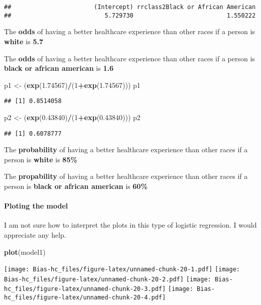\documentclass[]{article}
\newenvironment{Shaded}{\begin{snugshade}}{\end{snugshade}}
\newcommand{\DecValTok}[1]{\textcolor[rgb]{0.00,0.00,0.81}{#1}}
\newcommand{\FloatTok}[1]{\textcolor[rgb]{0.00,0.00,0.81}{#1}}
\newcommand{\KeywordTok}[1]{\textcolor[rgb]{0.13,0.29,0.53}{\textbf{#1}}}
\newcommand{\NormalTok}[1]{#1}
\newcommand{\OperatorTok}[1]{\textcolor[rgb]{0.81,0.36,0.00}{\textbf{#1}}}
\newcommand{\StringTok}[1]{\textcolor[rgb]{0.31,0.60,0.02}{#1}}
\let\oldparagraph\paragraph
\renewcommand{\paragraph}[1]{\oldparagraph{#1}\mbox{}}
\begin{document}
\begin{verbatim}
##                       (Intercept) rrclass2Black or African American 
##                          5.729730                          1.550222
\end{verbatim}

The \textbf{odds} of having a better healthcare experience than other
races if a person is \textbf{white} is \textbf{5.7}

The \textbf{odds} of having a better healthcare experience than other
races if a person is \textbf{black or african american} is \textbf{1.6}

\begin{Shaded}
\begin{Highlighting}[]
\NormalTok{p1 <-}\StringTok{ }\NormalTok{(}\KeywordTok{exp}\NormalTok{(}\FloatTok{1.74567}\NormalTok{)}\OperatorTok{/}\NormalTok{(}\DecValTok{1}\OperatorTok{+}\KeywordTok{exp}\NormalTok{(}\FloatTok{1.74567}\NormalTok{)))}
\NormalTok{p1}
\end{Highlighting}
\end{Shaded}

\begin{verbatim}
## [1] 0.8514058
\end{verbatim}

\begin{Shaded}
\begin{Highlighting}[]
\NormalTok{p2 <-}\StringTok{ }\NormalTok{(}\KeywordTok{exp}\NormalTok{(}\FloatTok{0.43840}\NormalTok{)}\OperatorTok{/}\NormalTok{(}\DecValTok{1}\OperatorTok{+}\KeywordTok{exp}\NormalTok{(}\FloatTok{0.43840}\NormalTok{)))}
\NormalTok{p2}
\end{Highlighting}
\end{Shaded}

\begin{verbatim}
## [1] 0.6078777
\end{verbatim}

The \textbf{probability} of having a better healthcare experience than
other races if a person is \textbf{white} is \textbf{85\%}

The \textbf{propability} of having a better healthcare experience than
other races if a person is \textbf{black or african american} is
\textbf{60\%}

\hypertarget{ploting-the-model}{%
\paragraph{Ploting the model}\label{ploting-the-model}}

I am not sure how to interpret the plots in this type of logistic
regression. I would appreciate any help.

\begin{Shaded}
\begin{Highlighting}[]
\KeywordTok{plot}\NormalTok{(model1)}
\end{Highlighting}
\end{Shaded}

\texttt{[image: Bias-hc\_files/figure-latex/unnamed-chunk-20-1.pdf]}
\texttt{[image: Bias-hc\_files/figure-latex/unnamed-chunk-20-2.pdf]}
\texttt{[image: Bias-hc\_files/figure-latex/unnamed-chunk-20-3.pdf]}
\texttt{[image: Bias-hc\_files/figure-latex/unnamed-chunk-20-4.pdf]}
\end{document}

